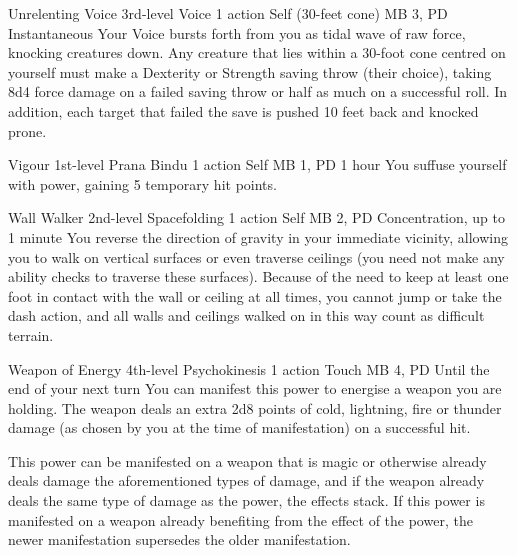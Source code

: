 \DndPowerHeader%
  {Unrelenting Voice}
  {3rd-level Voice}
  {1 action}
  {Self (30-feet cone)}
  {MB 3, PD \lvlthree}
  {Instantaneous}
Your Voice bursts forth from you as tidal wave of raw force,
knocking creatures down.
Any creature that lies within a 30-foot cone centred on yourself
must make a Dexterity or Strength saving throw (their choice),
taking 8d4 force damage on a failed saving throw or half as much on
a successful roll.
In addition, each target that failed the save is pushed 10 feet back
and knocked prone.

\DndPowerHeader%
  {Vigour}
  {1st-level Prana Bindu}
  {1 action}
  {Self}
  {MB 1, PD \lvlone}
  {1 hour}
You suffuse yourself with power,
gaining 5 temporary hit points.

\DndPowerHeader%
  {Wall Walker}
  {2nd-level Spacefolding}
  {1 action}
  {Self}
  {MB 2, PD \lvltwo}
  {Concentration, up to 1 minute}
You reverse the direction of gravity in your immediate vicinity,
allowing you to walk on vertical surfaces
or even traverse ceilings
(you need not make any ability checks to traverse these surfaces).
Because of the need to keep at least one foot in contact
with the wall or ceiling at all times,
you cannot jump or take the dash action,
and all walls and ceilings walked on in this way count as
difficult terrain.

\DndPowerHeader%
  {Weapon of Energy}
  {4th-level Psychokinesis}
  {1 action}
  {Touch}
  {MB 4, PD \lvlfour}
  {Until the end of your next turn}
You can manifest this power to
energise a weapon you are holding.
The weapon deals an extra 2d8 points of cold,
lightning, fire or thunder damage
(as chosen by you at the time of manifestation)
on a successful hit.

This power can be manifested on a weapon that
is magic or otherwise already deals damage the
aforementioned types of damage,
and if the weapon already deals the same type of damage
as the power,
the effects stack.
If this power is manifested on a weapon
already benefiting from the effect of the power,
the newer manifestation supersedes the older manifestation.